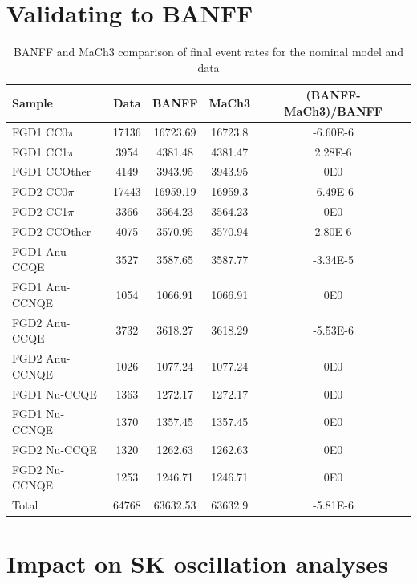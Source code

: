 \section{Validating to BANFF}

\begin{table}[h]
  \begin{tabular}{ l | c c c | c }
    \hline \hline 
                Sample & Data  & BANFF & MaCh3 & (BANFF-MaCh3)/BANFF \\ 
                \hline
                FGD1 CC0$\pi$ &  17136 &  16723.69 & 16723.8 & -6.60E-6 \\
                FGD1 CC1$\pi$ &  3954 &  4381.48 & 4381.47 & 2.28E-6\\ 
                FGD1 CCOther &  4149 &  3943.95 & 3943.95 & 0E0\\ 
                \hline
                FGD2 CC0$\pi$ &  17443 &  16959.19 & 16959.3 & -6.49E-6 \\
                FGD2 CC1$\pi$ &  3366 &  3564.23 & 3564.23 & 0E0\\
                FGD2 CCOther &  4075 &  3570.95 & 3570.94 & 2.80E-6 \\
                \hline
                FGD1 Anu-CCQE &  3527 &  3587.65 & 3587.77 & -3.34E-5\\ 
                FGD1 Anu-CCNQE &  1054 &  1066.91 & 1066.91 & 0E0\\
                \hline
                FGD2 Anu-CCQE &  3732 &  3618.27 & 3618.29 & -5.53E-6 \\
                FGD2 Anu-CCNQE &  1026 &  1077.24 & 1077.24 & 0E0 \\
                \hline
                FGD1 Nu-CCQE &  1363 &  1272.17 & 1272.17 & 0E0\\
                FGD1 Nu-CCNQE &  1370 &  1357.45 & 1357.45 & 0E0 \\
                \hline
                FGD2 Nu-CCQE &  1320 &  1262.63 & 1262.63 & 0E0 \\
                FGD2 Nu-CCNQE &  1253 &  1246.71 & 1246.71 & 0E0 \\
                \hline
                Total &  64768 &  63632.53 & 63632.9 & -5.81E-6 \\
                \hline
                \hline
  \end{tabular}
        \caption{BANFF and MaCh3 comparison of final event rates for the nominal model and data}
        \label{tab:eventrate_banff_mach3}
\end{table}
\section{Impact on SK oscillation analyses}
